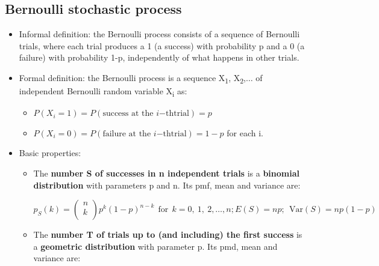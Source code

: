 \documentclass[12pt]{report}
\renewcommand{\_}{\kern-1.5pt\textunderscore\kern-1.5pt}
\begin{document}
\subsection*{Bernoulli stochastic process}
\begin{itemize}
	\item Informal definition: the Bernoulli process consists of a sequence of Bernoulli trials, where each trial produces a 1 (a success) with probability p and a 0 (a failure) with probability 1-p, independently of what happens in other trials.\par

	\item Formal definition: the Bernoulli process is a sequence X\textsubscript{1}, X\textsubscript{2},$ \ldots $  of independent Bernoulli random variable X\textsubscript{i} as:\par

\begin{itemize}
	\item  \( P \left( X_{i}=1 \right) =P \left( \mathrm{\text{success at the }}i\mathrm{-th trial} \right) =p \) \par

	\item  \( P \left( X_{i}=0 \right) =P \left( \mathrm{\text{failure at the }}i\mathrm{-th trial} \right) =1-p \)  for each i.  \par


\end{itemize}
	\item Basic properties:\par

\begin{itemize}
	\item The \textbf{number S of successes in n independent trials} is a \textbf{binomial distribution} with parameters p and n. Its pmf, mean and variance are:\par

 \[ p_{S} \left( k \right) = \left( \begin{matrix}
n\\
k\\
\end{matrix}
 \right) p^{k} \left( 1-p \right) ^{n-k}~~\mathrm{for~~}k=0,~1,~2, \ldots ,n;   E \left( S \right) =np;~~ \mathrm{Var} \left( S \right) =np \left( 1-p \right)  \] \par

	\item The \textbf{number T of trials up to (and including) the first success} is a \textbf{geometric distribution} with parameter p. Its pmd, mean and variance are:\par


\end{itemize}
\end{itemize}
\end{document}
